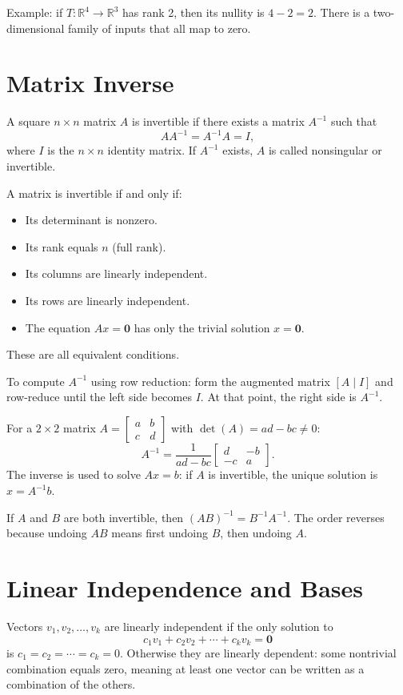 \documentclass[11pt]{article}
\begin{document}
Example: if $T: \mathbb{R}^4 \to \mathbb{R}^3$ has rank 2, then its nullity is $4 - 2 = 2$. There is a two-dimensional family of inputs that all map to zero.

\section*{Matrix Inverse}

A square $n \times n$ matrix $A$ is invertible if there exists a matrix $A^{-1}$ such that
\[
A A^{-1} = A^{-1} A = I,
\]
where $I$ is the $n \times n$ identity matrix. If $A^{-1}$ exists, $A$ is called nonsingular or invertible.

A matrix is invertible if and only if:
\begin{itemize}
  \item Its determinant is nonzero.
  \item Its rank equals $n$ (full rank).
  \item Its columns are linearly independent.
  \item Its rows are linearly independent.
  \item The equation $Ax = \mathbf{0}$ has only the trivial solution $x = \mathbf{0}$.
\end{itemize}
These are all equivalent conditions.

To compute $A^{-1}$ using row reduction: form the augmented matrix $[A \mid I]$ and row-reduce until the left side becomes $I$. At that point, the right side is $A^{-1}$.

For a $2 \times 2$ matrix $A = \begin{bmatrix} a & b \\ c & d \end{bmatrix}$ with $\det(A) = ad - bc \neq 0$:
\[
A^{-1} = \frac{1}{ad-bc} \begin{bmatrix} d & -b \\ -c & a \end{bmatrix}.
\]
The inverse is used to solve $Ax = b$: if $A$ is invertible, the unique solution is $x = A^{-1} b$.

If $A$ and $B$ are both invertible, then $(AB)^{-1} = B^{-1} A^{-1}$. The order reverses because undoing $AB$ means first undoing $B$, then undoing $A$.

\section*{Linear Independence and Bases}

Vectors $v_1, v_2, \ldots, v_k$ are linearly independent if the only solution to
\[
c_1 v_1 + c_2 v_2 + \cdots + c_k v_k = \mathbf{0}
\]
is $c_1 = c_2 = \cdots = c_k = 0$. Otherwise they are linearly dependent: some nontrivial combination equals zero, meaning at least one vector can be written as a combination of the others.
\end{document}
